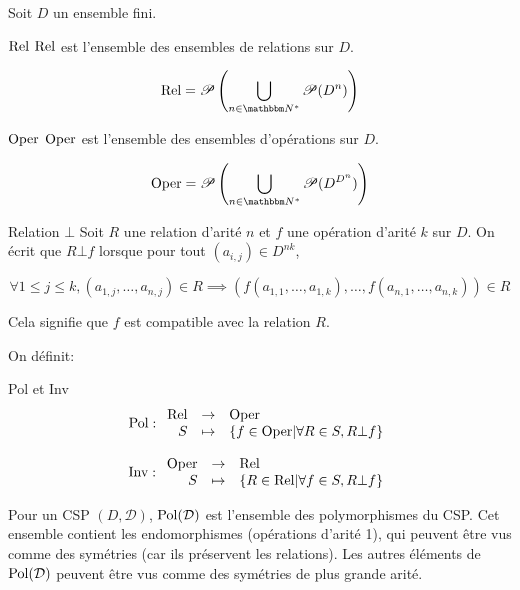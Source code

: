 Soit $D$ un ensemble fini.

\begin{defi}{$\text{Rel}$}
    $\text{Rel}$ est l'ensemble des ensembles de relations sur $D$.

    $$\Rel = \P\left(\bigcup_{n\in\mathbb{N^*}} \P(D^n)\right)$$
\end{defi}

\begin{defi}{$\text{Oper}$}
    $\text{Oper}$ est l'ensemble des ensembles d'opérations sur $D$.

    $$\Oper = \P\left(\bigcup_{n\in\mathbb{N^*}} \P(D^{D^n})\right)$$
\end{defi}

\begin{defi}{Relation $\bot$}
    Soit $R$ une relation d'arité $n$ et $f$ une opération d'arité $k$ sur $D$.
    On écrit que $R \bot f$ lorsque pour tout $(a_{i,j}) \in D^{nk}$,
    
    $$ \forall 1 \leq j \leq k, (a_{1,j},\dots,a_{n,j}) \in R \implies
    (f(a_{1,1},\dots,a_{1,k}),\dots,f(a_{n,1},\dots,a_{n,k})) \in R$$
    
    Cela signifie que $f$ est compatible avec la relation $R$.
\end{defi}

On définit:

\begin{defi}{Pol et Inv}
    $$\text{Pol}:\begin{array}{rcl}\text{Rel} & \rightarrow & \text{Oper} \\
    S & \mapsto & \{f\in\text{Oper} | \forall R\in S, R\bot f\} \\
    \end{array}$$
    
    $$\text{Inv}:\begin{array}{rcl}\text{Oper} & \rightarrow & \text{Rel} \\
    S & \mapsto & \{R\in\text{Rel} | \forall f\in S, R\bot f\} \\
    \end{array}$$
\end{defi}

Pour un CSP $(D,\mathcal{D})$, $\text{Pol}(\mathcal{D})$ est l'ensemble des
polymorphismes du CSP. Cet ensemble contient les endomorphismes (opérations
d'arité 1), qui peuvent être vus comme des symétries (car ils préservent les
relations). Les autres éléments de $\text{Pol}(\mathcal{D})$ peuvent être vus comme
des symétries de plus grande arité.

